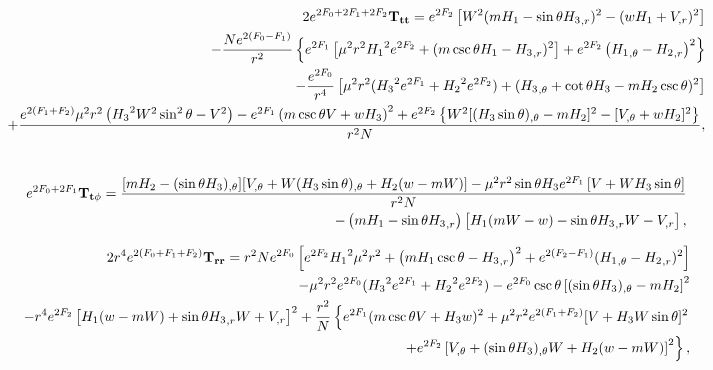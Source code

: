 \documentclass{article}
\numberwithin{equation}{section}
\begin{document}
\begin{eqnarray}
&& 2e^{2F_0+2F_1+2F_2}{\bf T_{tt}}=e^{2F_2}\left[ W^2(m{H_1}  
- \sin\theta  
{H_3}_{,r} )^2
-(wH_1+V_{,r})^2\right] \nonumber \\
% 
&&
-\frac{N e^{2 ({F_0}-F_1)}}{r^2} \left\{e^{2 {F_1}}\left[ {\mu^2} r^2 {H_1}^2 e^{2 {F_2}}
+({m} \csc \theta  {H_1}
-{H_3}_{,r})^2\right] +e^{2
{F_2}}\left( {H_1}_{,\theta}- 
{H_2}_{,r}\right)^2\right\}
\nonumber \\
%
&&
- \frac{e^{2 F_0}}{r^4} \left[{\mu^2} 
r^2( {H_3}^2 e^{2 {F_1}}+ {H_2}^2 e^{2
{F_2}}) + ({H_3}_{,\theta}+ \cot
\theta  {H_3}-mH_2\csc\theta)^2\right]  \nonumber \\
%
%
&&
+\frac{ e^{2 (F_1+{F_2})} {\mu^2} r^2\left({H_3}^2  W^2 \sin ^2\theta  - V^2\right) -e^{2 {F_1}}\left(
{m} \csc\theta 
 V +w{H_3}  \right)^2  +e^{2 {F_2}}\left\{W^2[(H_3\sin\theta)_{,\theta}-mH_2]^2-[V_{,\theta}+wH_2]^2\right\}}{r^2N}, \nonumber \\
 && 
%
\end{eqnarray}


\begin{eqnarray}
&&  e^{2F_0+2F_1}{\bf T_{t\phi}}=\frac{[mH_2-(\sin\theta H_3)_{,\theta}][V_{,\theta}+W(H_3\sin\theta)_{,\theta}+H_2(w-mW)]-{\mu^2}r^2 \sin\theta {H_3} e^{2 {F_1}} \left[ 
V+WH_3 \sin\theta\right]}{r^2N}\nonumber \\ 
%
&&
- \left({m} {H_1}-\sin\theta 
{H_3}_{,r}\right) \left[{H_1} ({m} W-w)-\sin \theta {H_3}_{,r} W-V_{,r}\right],
\end{eqnarray}






\begin{eqnarray}
&& 2r^4e^{2(F_0+F_1+F_2)}{\bf T_{rr}}=
r^2 N e^{2 {F_0}} \left[
e^{2 F_2} {H_1}^2 {\mu^2} r^2
+\left( {m H_1} \csc\theta- {H_3}_{,r}\right)^2+e^{2 ({F_2}-F_1)}( {H_1}_{,\theta}-
{H_2}_{,r})^2\right] \nonumber \\ 
%
&&
-{\mu^2} r^2e^{2 {F_0}}( {H_3}^2 e^{2 {F_1}}+{H_2}^2e^{2F_2})-e^{2 {F_0}}\csc\theta\left[(\sin\theta{H_3})_{,\theta}-mH_2\right]^2  \nonumber \\
%
&&
-r^4 e^{2 {F_2}} \left[ {H_1} (w-{m} W) + \sin\theta  {H_3}_{,r} W+  
V_{,r}\right]^2
%
%
+\frac{r^2}{N} \left\{e^{2 {F_1}}({m} \csc\theta 
 V+{H_3}w)^2 +{\mu^2} r^2e^{2 ({F_1}+F_2)}[V+ {H_3} W \sin\theta]^2 
 \right. \nonumber \\
%
&&
\left.
+e^{2 {F_2}}\left[
V_{,\theta}+ (\sin\theta  
{H_3})_{,\theta} W+ 
{H_2} (w-{m} W)\right]^2\right\},
%
\end{eqnarray}
  
\end{document}
